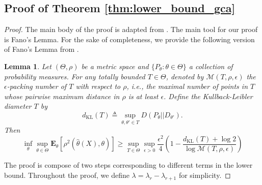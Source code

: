 \documentclass[11pt]{article}
\newcommand{\kl}{\mathrm{KL}}
\newcommand{\0}{{\mathbf{0}}}
\newcommand{\E}{{\mathbf{E}}}
\newtheorem{lemma}[theorem]{Lemma}
\begin{document}
\subsection{Proof of Theorem \ref{thm:lower_bound_gca}}
\begin{proof}
The main body of the proof is adapted from \cite{gao2015minimax}. The main tool for our proof is Fano's Lemma. For the sake of completeness, we provide the following version of Fano's Lemma  from \cite{yu1997festschrift}.
\begin{lemma}
\label{lemma:fano}
Let $(\Theta,\rho)$ be a metric space and $\{P_\theta:\theta\in\Theta\}$ a collection of probability measures. For any totally bounded $T\in\Theta$, denoted by $\mathcal{M}(T,\rho,\epsilon)$ the $\epsilon$-packing number of $T$ with respect to $\rho$, i.e., the maximal number of points in $T$ whose pairwise maximum distance in $\rho$ is at least $\epsilon$. Define the Kullback-Leibler diameter $T$ by\begin{equation*}
    d_{\kl}(T) \triangleq \sup_{\theta, \theta'\in T} D(P_\theta||D_{\theta'}).
\end{equation*}
Then \begin{equation*}
    \inf_\theta \sup_{\theta\in\Theta} \E_\theta[\rho^2(\hat{\theta}(X), \theta)] \geq \sup_{T\in\Theta} \sup_{\epsilon>0} \frac{\epsilon^2}{4}\left(1-\frac{d_\kl(T)+\log 2}{\log \mathcal{M}(T,\rho,\epsilon)}\right)
\end{equation*}
\end{lemma}
The proof is compose of two steps corresponding to different terms in the lower bound.  Throughout the proof, we define $\lambda = \lambda_r-\lambda_{r+1}$ for simplicity.


\end{proof}
\end{document}
